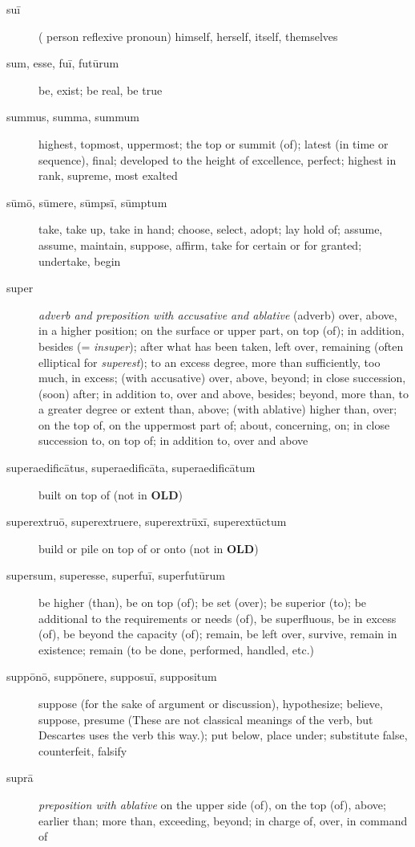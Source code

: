 \begin{description}
    \item[suī] \marginnote{*}( person reflexive pronoun) himself, herself, itself, themselves
    \item[sum, esse, fuī, futūrum] \marginnote{*}be, exist; be real, be true
    \item[summus, summa, summum] highest, topmost, uppermost; the top or summit (of); latest (in time or sequence), final; developed to the height of excellence, perfect; highest in rank, supreme, most exalted
    \item[sūmō, sūmere, sūmpsī, sūmptum] \marginnote{*}\marginnote{*}take, take up, take in hand; choose, select, adopt; lay hold of; assume, assume, maintain, suppose, affirm, take for certain or for granted; undertake, begin
    \item[super] \marginnote{*}\textit{adverb and preposition with accusative and ablative} (adverb) over, above, in a higher position; on the surface or upper part, on top (of); in addition, besides (= \textit{insuper}); after what has been taken, left over, remaining (often elliptical for \textit{superest}); to an excess degree, more than sufficiently, too much, in excess; (with accusative) over, above, beyond; in close succession, (soon) after; in addition to, over and above, besides; beyond, more than, to a greater degree or extent than, above; (with ablative) higher than, over; on the top of, on the uppermost part of; about, concerning, on; in close succession to, on top of; in addition to, over and above
    \item[superaedificātus, superaedificāta, superaedificātum] built on top of (not in \textbf{OLD})
    \item[superextruō, superextruere, superextrūxī, superextūctum] build or pile on top of or onto (not in \textbf{OLD})
    \item[supersum, superesse, superfuī, superfutūrum] \marginnote{*}be higher (than), be on top (of); be set (over); be superior (to); be additional to the requirements or needs (of), be superfluous, be in excess (of), be beyond the capacity (of); remain, be left over, survive, remain in existence; remain (to be done, performed, handled, etc.)
    \item[suppōnō, suppōnere, supposuī, suppositum] suppose (for the sake of argument or discussion), hypothesize; believe, suppose, presume (These are not classical meanings of the verb, but Descartes uses the verb this way.); put below, place under; substitute false, counterfeit, falsify
    \item[suprā] \marginnote{*}\textit{preposition with ablative} on the upper side (of), on the top (of), above; earlier than; more than, exceeding, beyond; in charge of, over, in command of

\end{description}
